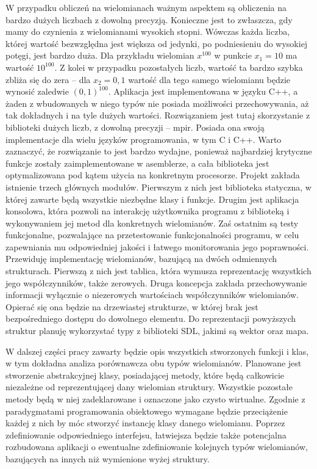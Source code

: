 \documentclass[oneside,a4paper]{book}
\begin{document}
	W przypadku obliczeń na wielomianach ważnym aspektem są obliczenia na bardzo dużych liczbach z dowolną precyzją. Konieczne jest to zwłaszcza, gdy mamy do czynienia z wielomianami wysokich stopni. Wówczas każda liczba, której wartość bezwzględna jest większa od jedynki, po podniesieniu do wysokiej potęgi, jest bardzo duża. Dla przykładu wielomian $x^{100}$ w punkcie $x_1=10$ ma wartość $10^{100}$. Z kolei w przypadku pozostałych liczb, wartość ta bardzo szybka zbliża się do zera – dla $x_2=0,1$ wartość dla tego samego wielomianu będzie wynosić zaledwie $(0,1)^{100}$. Aplikacja jest implementowana w języku C++, a żaden z wbudowanych w niego typów nie posiada możliwości przechowywania, aż tak dokładnych i na tyle dużych wartości. Rozwiązaniem jest tutaj skorzystanie z biblioteki dużych liczb, z dowolną precyzji – mpir. Posiada ona swoją implementacje dla wielu języków programowania, w tym C i C++.  Warto zaznaczyć, że rozwiązanie to jest bardzo wydajne, ponieważ najbardziej krytyczne funkcje zostały zaimplementowane w asemblerze, a cała biblioteka jest optymalizowana pod kątem użycia na konkretnym procesorze.
	Projekt zakłada istnienie trzech głównych modułów. Pierwszym z nich jest biblioteka statyczna, w której zawarte będą wszystkie niezbędne klasy i funkcje. Drugim jest aplikacja konsolowa, która pozwoli na interakcję użytkownika programu z biblioteką i wykonywaniem jej metod dla konkretnych wielomianów. Zaś ostatnim są testy funkcjonalne, pozwalające na przetestowanie funkcjonalności programu, w celu zapewniania mu odpowiedniej jakości i łatwego monitorowania jego poprawności.
	Przewiduję implementację wielomianów, bazującą na dwóch odmiennych strukturach. Pierwszą z nich jest tablica, która wymusza reprezentację wszystkich jego współczynników, także zerowych. Druga koncepcja zakłada przechowywanie informacji wyłącznie o niezerowych wartościach  współczynników wielomianów. Opierać się ona będzie na drzewiastej strukturze, w której brak jest bezpośredniego dostępu do dowolnego elementu. Do reprezentacji powyższych struktur planuję wykorzystać typy z biblioteki SDL, jakimi są wektor oraz mapa.
	
	W dalszej części pracy zawarty będzie opis wszystkich stworzonych funkcji i klas, w tym dokładna analiza porównawcza obu typów wielomianów. Planowane jest stworzenie abstrakcyjnej klasy, posiadającej metody, które będą całkowicie niezależne od reprezentującej dany wielomian struktury. Wszystkie pozostałe metody będą w niej zadeklarowane i oznaczone jako czysto wirtualne. Zgodnie z paradygmatami programowania obiektowego wymagane będzie przeciążenie każdej z nich by móc stworzyć instancję klasy danego wielomianu. Poprzez zdefiniowanie odpowiedniego interfejsu, łatwiejsza będzie także potencjalna rozbudowana aplikacji o ewentualne zdefiniowanie kolejnych typów wielomianów, bazujących na innych niż wymienione wyżej struktury.
	
\end{document}
